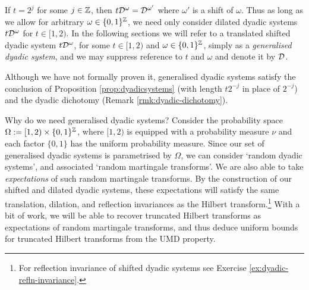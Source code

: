 If $t = 2^{j}$ for some $j \in \mathbb{Z}$, then $t\mathcal{D}^{\omega} = \mathcal{D}^{\omega'}$ where $\omega'$ is a shift of $\omega$.
Thus as long as we allow for arbitrary $\omega \in \{0,1\}^{\mathbb{Z}}$, we need only consider dilated dyadic systems $t\mathcal{D}^{\omega}$ for $t \in [1,2)$.
In the following sections we will refer to a translated shifted dyadic system $t\mathcal{D}^{\omega}$, for some $t \in [1,2)$ and $\omega \in \{0,1\}^{\mathbb{Z}}$, simply as a \emph{generalised dyadic system}, and we may suppress reference to $t$ and $\omega$ and denote it by $\mathcal{D}$.

\begin{rmk}
  Although we have not formally proven it, generalised dyadic systems satisfy the conclusion of Proposition \ref{prop:dyadicsystems} (with length $t2^{-j}$ in place of $2^{-j}$) and the dyadic dichotomy (Remark \ref{rmk:dyadic-dichotomy}).  
\end{rmk}


Why do we need generalised dyadic systems?
Consider the probability space $\Omega := [1,2) \times \{0,1\}^{\mathbb{Z}}$, where $[1,2)$ is equipped with a probability measure $\nu$ and each factor $\{0,1\}$ has the uniform probability measure.
Since our set of generalised dyadic systems is parametrised by $\Omega$, we can consider `random dyadic systems', and associated `random martingale transforms'.
We are also able to take \emph{expectations} of such random martingale transforms.
By the construction of our shifted and dilated dyadic systems, these expectations will satisfy the same translation, dilation, and reflection invariances as the Hilbert transform.\footnote{For reflection invariance of shifted dyadic systems see Exercise \ref{ex:dyadic-refln-invariance}.}
With a bit of work, we will be able to recover truncated Hilbert transforms as expectations of random martingale transforms, and thus deduce uniform bounds for truncated Hilbert transforms from the UMD property.

